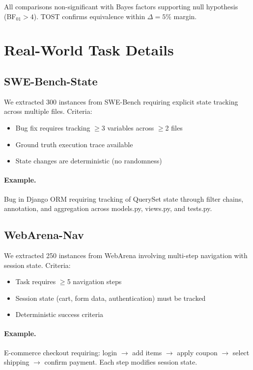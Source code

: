 \documentclass{article}
\theoremstyle{plain}
\theoremstyle{definition}
\theoremstyle{remark}
\begin{document}
All comparisons non-significant with Bayes factors supporting null hypothesis (BF$_{01} > 4$). TOST confirms equivalence within $\Delta = 5\%$ margin.


\section{Real-World Task Details}
\label{app:realworld}

\subsection{SWE-Bench-State}

We extracted 300 instances from SWE-Bench \citep{jimenez2024swebench} requiring explicit state tracking across multiple files. Criteria:
\begin{itemize}
\item Bug fix requires tracking $\geq$3 variables across $\geq$2 files
\item Ground truth execution trace available
\item State changes are deterministic (no randomness)
\end{itemize}

\paragraph{Example.} Bug in Django ORM requiring tracking of QuerySet state through filter chains, annotation, and aggregation across models.py, views.py, and tests.py.

\subsection{WebArena-Nav}

We extracted 250 instances from WebArena \citep{zhou2024webarena} involving multi-step navigation with session state. Criteria:
\begin{itemize}
\item Task requires $\geq$5 navigation steps
\item Session state (cart, form data, authentication) must be tracked
\item Deterministic success criteria
\end{itemize}

\paragraph{Example.} E-commerce checkout requiring: login $\rightarrow$ add items $\rightarrow$ apply coupon $\rightarrow$ select shipping $\rightarrow$ confirm payment. Each step modifies session state.
\end{document}
